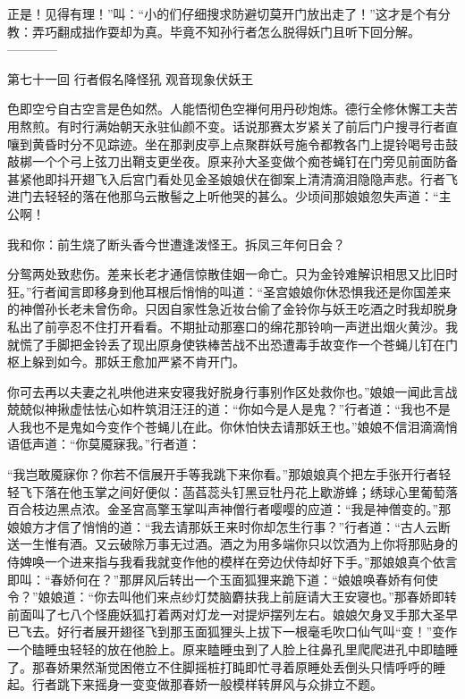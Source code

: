 \documentclass[12pt,UTF8]{ctexbook}
\begin{document}
正是！见得有理！”叫：“小的们仔细搜求防避切莫开门放出走了！”这才是个有分教：弄巧翻成拙作耍却为真。毕竟不知孙行者怎么脱得妖门且听下回分解。
------------

第七十一回 行者假名降怪犼 观音现象伏妖王

色即空兮自古空言是色如然。人能悟彻色空禅何用丹砂炮炼。德行全修休懈工夫苦用熬煎。有时行满始朝天永驻仙颜不变。话说那赛太岁紧关了前后门户搜寻行者直嚷到黄昏时分不见踪迹。坐在那剥皮亭上点聚群妖号施令都教各门上提铃喝号击鼓敲梆一个个弓上弦刀出鞘支更坐夜。原来孙大圣变做个痴苍蝇钉在门旁见前面防备甚紧他即抖开翅飞入后宫门看处见金圣娘娘伏在御案上清清滴泪隐隐声悲。行者飞进门去轻轻的落在他那乌云散髻之上听他哭的甚么。少顷间那娘娘忽失声道：“主公啊！

我和你：前生烧了断头香今世遭逢泼怪王。拆凤三年何日会？

分鸳两处致悲伤。差来长老才通信惊散佳姻一命亡。只为金铃难解识相思又比旧时狂。”行者闻言即移身到他耳根后悄悄的叫道：“圣宫娘娘你休恐惧我还是你国差来的神僧孙长老未曾伤命。只因自家性急近妆台偷了金铃你与妖王吃酒之时我却脱身私出了前亭忍不住打开看看。不期扯动那塞口的绵花那铃响一声迸出烟火黄沙。我就慌了手脚把金铃丢了现出原身使铁棒苦战不出恐遭毒手故变作一个苍蝇儿钉在门枢上躲到如今。那妖王愈加严紧不肯开门。

你可去再以夫妻之礼哄他进来安寝我好脱身行事别作区处救你也。”娘娘一闻此言战兢兢似神揪虚怯怯心如杵筑泪汪汪的道：“你如今是人是鬼？”行者道：“我也不是人我也不是鬼如今变作个苍蝇儿在此。你休怕快去请那妖王也。”娘娘不信泪滴滴悄语低声道：“你莫魇寐我。”行者道：

“我岂敢魇寐你？你若不信展开手等我跳下来你看。”那娘娘真个把左手张开行者轻轻飞下落在他玉掌之间好便似：菡萏蕊头钉黑豆牡丹花上歇游蜂；绣球心里葡萄落百合枝边黑点浓。金圣宫高擎玉掌叫声神僧行者嘤嘤的应道：“我是神僧变的。”那娘娘方才信了悄悄的道：“我去请那妖王来时你却怎生行事？”行者道：“古人云断送一生惟有酒。又云破除万事无过酒。酒之为用多端你只以饮酒为上你将那贴身的侍婢唤一个进来指与我看我就变作他的模样在旁边伏侍却好下手。”那娘娘真个依言即叫：“春娇何在？”那屏风后转出一个玉面狐狸来跪下道：“娘娘唤春娇有何使令？”娘娘道：“你去叫他们来点纱灯焚脑麝扶我上前庭请大王安寝也。”那春娇即转前面叫了七八个怪鹿妖狐打着两对灯龙一对提炉摆列左右。娘娘欠身叉手那大圣早已飞去。好行者展开翅径飞到那玉面狐狸头上拔下一根毫毛吹口仙气叫“变！”变作一个瞌睡虫轻轻的放在他脸上。原来瞌睡虫到了人脸上往鼻孔里爬爬进孔中即瞌睡了。那春娇果然渐觉困倦立不住脚摇桩打盹即忙寻着原睡处丢倒头只情呼呼的睡起。行者跳下来摇身一变变做那春娇一般模样转屏风与众排立不题。
\end{document}
